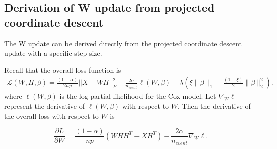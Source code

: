 \documentclass[
]{article}
\begin{document}
\subsection{Derivation of W update from projected coordinate descent}

The W update can be derived directly from the projected coordinate
descent update with a specific step size.

Recall that the overall loss function is \begin{align*}
    \mathcal{L}(W,H,\beta) = \frac{(1-\alpha)}{2np} ||X - WH||^2_F - \frac{2 \alpha}{n_{event}} \ell(W,\beta) + \lambda\left(\xi\|\beta\|_1 + \frac{(1-\xi)}{2}\|\beta\|_2^2\right).
\end{align*} where \(\ell(W,\beta)\) is the log-partial likelihood for
the Cox model. Let \(\nabla_W \ell\) represent the derivative of
\(\ell(W,\beta)\) with respect to \(W\). Then the derivative of the
overall loss with respect to \(W\) is

\begin{equation*}
  \frac{\partial L}{\partial W} = \frac{(1-\alpha)}{np}\left( WHH^T - XH^T \right) - \frac{2\alpha}{n_{event}} \nabla_W \ell.
\end{equation*}
\end{document}
